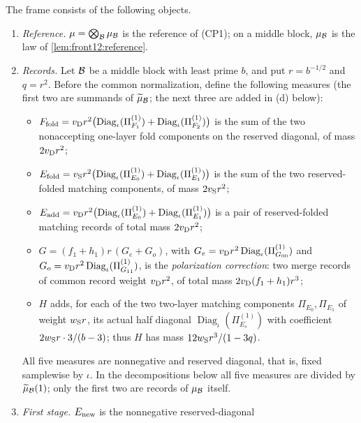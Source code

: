 \begin{definition}\label{def:record:frame}
The frame consists of the following objects.
\begin{enumerate}[label=(\alph*)]
\item \emph{Reference.} $\mu=\bigotimes_{\mathcal B}\mu_{\mathcal B}$ is the reference of
 (CP1); on a middle block, $\mu_{\mathcal B}$ is the law of
 \cref{lem:front12:reference}.
\item \emph{Records.} Let $\mathcal B$ be a middle block with least prime $b$, and
 put $r=b^{-1/2}$ and $q=r^2$. Before the common normalization, define the following measures (the first two are summands of $\widetilde\mu_{\mathcal B}$; the next three are added in (d) below):
 \begin{itemize}
 \item $F_{\rm fold}=v_{\rm D}r^2\bigl(\operatorname{Diag}_\iota(\Pi^{(1)}_{F_1})
  +\operatorname{Diag}_\iota(\Pi^{(1)}_{F_2})\bigr)$ is the sum of the two
  nonaccepting one-layer fold components on the reserved diagonal, of mass $2v_{\rm D}r^2$;
 \item $E_{\rm fold}=v_{\rm S}r^2\bigl(\operatorname{Diag}_\iota(\Pi^{(1)}_{E_0})
  +\operatorname{Diag}_\iota(\Pi^{(1)}_{E_1})\bigr)$ is the sum of the two
  reserved-folded matching components, of mass $2v_{\rm S}r^2$;
 \item $E_{\rm add}=v_{\rm D}r^2\bigl(\operatorname{Diag}_\iota(\Pi^{(1)}_{E_0})
  +\operatorname{Diag}_\iota(\Pi^{(1)}_{E_1})\bigr)$ is a pair of reserved-folded
  matching records of total mass $2v_{\rm D}r^2$;
 \item $G=(f_1+h_1)r\,(G_e+G_o)$, with
  $G_e=v_{\rm D}r^2\operatorname{Diag}_\iota(\Pi^{(1)}_{G_{00}})$ and
  $G_o=v_{\rm D}r^2\operatorname{Diag}_\iota(\Pi^{(1)}_{G_{11}})$, is the
  \emph{polarization correction}: two merge records of common record weight
  $v_{\rm D}r^2$, of total mass $2v_{\rm D}(f_1+h_1)r^3$;
 \item $H$ adds, for each of the two two-layer matching components
  $\Pi_{E_0},\Pi_{E_1}$ of weight $w_{\rm S}r$, its actual half diagonal
  $\operatorname{Diag}_\iota(\Pi^{(1)}_{E_s})$ with coefficient
  $2w_{\rm S}r\cdot3/(b-3)$; thus $H$ has mass $12w_{\rm S}r^3/(1-3q)$.
 \end{itemize}
 All five measures are nonnegative and reserved diagonal, that is, fixed
 samplewise by $\iota$. In the decompositions below all five measures are
 divided by $\widetilde\mu_{\mathcal B}(1)$; only the first two are records of $\mu_{\mathcal B}$ itself.
\item \emph{First stage.} $E_{\rm new}$ is the nonnegative reserved-diagonal

\end{enumerate}
\end{definition}

